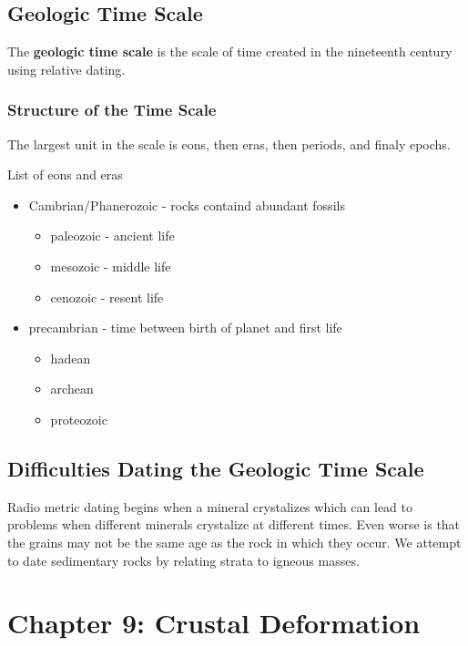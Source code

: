 \documentclass{article}
\begin{document}
\subsection{Geologic Time Scale} %
\label{sub:geologic_time_scale}
The \textbf{geologic time scale} is the scale of time created in the nineteenth century using relative dating.

\subsubsection{Structure of the Time Scale} %
\label{sub:structure_of_the_time_scale}
The largest unit in the scale is eons, then eras, then periods, and finaly epochs.

List of eons and eras
\begin{itemize}
    \item Cambrian/Phanerozoic - rocks containd abundant fossils
    \begin{itemize}
        \item paleozoic - ancient life
        \item mesozoic - middle life
        \item cenozoic - resent life
    \end{itemize}
    \item precambrian - time between birth of planet and first life
    \begin{itemize}
        \item hadean
        \item archean
        \item proteozoic
    \end{itemize}
\end{itemize}

\subsection{Difficulties Dating the Geologic Time Scale} %
\label{sub:difficulties_dating_the_geologic_time_scale}
Radio metric dating begins when a mineral crystalizes which can lead to problems when different minerals crystalize at different times. Even worse is that the grains may not be the same age as the rock in which they occur. We attempt to date sedimentary rocks by relating strata to igneous masses.

\section{Chapter 9: Crustal Deformation} %
\label{sec:chapter_9_crustal_deformation}
\end{document}
